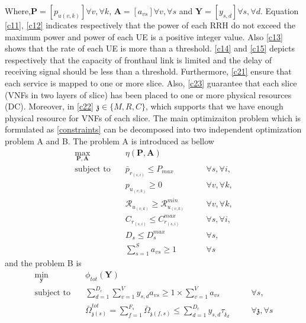 \documentclass[conference]{IEEEtran}
\begin{document}
Where,$\boldsymbol{P} =[p_{u(v,k)}]  \forall v , \forall k $, $\boldsymbol{A} =[a_{vs}]  \forall v , \forall s $ and $\boldsymbol{Y} =[y_{s,d}]  \forall s , \forall d $. 
Equation \eqref{c11}, \eqref{c12} indicates respectively that the power of each RRH do not exceed the maximum power and power of each UE is a positive integer value. Also \eqref{c13} shows that the rate of each UE is more than a threshold. \eqref{c14} and \eqref{c15} depicts respectively that the capacity of fronthaul link is limited and the delay of receiving signal should be less than a threshold.  
Furthermore, \eqref{c21}
ensure that each service is mapped to one or more slice.
Also, \eqref{c23} guarantee that each slice (VNFs in two layers of slice) has been placed to one or more physical resources (DC). Moreover, in \eqref{c22}  $\mathfrak{z}\in \{M,R,C\}$, which supports 
that we have enough physical resource for VNFs of each slice.\newline 
The main optimizaiton problem which is formulated as \eqref{constraints} can be decomposed into two independent optimization problem A and B. The problem A is introduced as bellow
\begin{subequations}
\begin{alignat}{4}
\max\limits_{\boldsymbol{P}, \boldsymbol{A} }   \quad &   \eta(\boldsymbol{P},\boldsymbol{A})\\
\text{subject to} \quad  & \bar{p}_{r_{(s,i)}} \leq P_{max} && \quad \forall s, \forall i,   \\
&p_{u_{(v,k)}}  \geq 0  &&\quad \forall v, \forall k, \\
&\mathcal{R}_{u_{(v,k)}} \geq  \mathcal{R}_{u_{(v,k)}}^{min} && \quad \forall v, \forall k, \\                                 
&C_{r_{(s,i)}} \leq C_{r_{(s,i)}}^{max}  &&\quad \forall s, \forall i,\label{cc14} \\
&D_{s} \leq D_{s}^{max}  &&\quad \forall s, \label{cc15} \\
& \sum_{s=1}^{S}a_{vs} \geq 1 &&\quad \forall s
\end{alignat} 
\label{constraints1}
\end{subequations}
and the problem B is 
\begin{subequations}
\begin{alignat}{4}
\min\limits_{\boldsymbol{y} }   \quad &   \phi_{tot}(\boldsymbol{Y})\\
\text{subject to} \quad & \sum_{d=1}^{D_c}\sum_{v=1}^{V}y_{s,d}a_{vs} \geq 1\times\sum_{v=1}^{V}a_{vs} &&\quad \forall s, \\
&  \bar{\Omega}_{\mathfrak{z}(s)}^{tot} = \sum_{f=1}^{F_s}\bar{\Omega}_{\mathfrak{z}(f,s)} \leq  \sum_{d=1}^{D_c} y_{s,d} \tau_{\mathfrak{z}_d}                      
 && \quad \forall \mathfrak{z}, \forall s\label{eqomega}
\end{alignat}
\label{constraints2}
\end{subequations}
\end{document}
